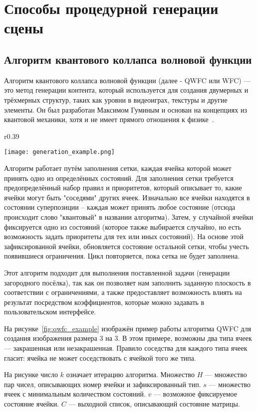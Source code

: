 \section{Способы процедурной генерации сцены}

\subsection*{Алгоритм квантового коллапса волновой функции}

Алгоритм квантового коллапса волновой функции (далее - QWFC или WFC) — это метод генерации контента, который используется для создания двумерных и трёхмерных структур, таких как уровни в видеоиграх, текстуры и другие элементы. Он был разработан Максимом Гуминым и основан на концепциях из квантовой механики, хотя и не имеет прямого отношения к физике~\cite{QWFC}.

\begin{wrapfigure}{r}{0.39\textwidth}
  
  \texttt{[image: generation\_example.png]}
  \caption{Пример работы алгоритма QWFC}
  \label{fig:qwfc_example}
\end{wrapfigure}

Алгоритм работает путём заполнения сетки, каждая ячейка которой может принять одно из определённых состояний. Для заполнения сетки требуется предопределённый набор правил и приоритетов, который описывает то, какие ячейки могут быть "соседями" других ячеек. Изначально все ячейки находятся в состоянии суперпозиции -- каждая может принять любое состояние (отсюда происходит слово "квантовый" в названии алгоритма). Затем, у случайной ячейки фиксируется одно из состояний (которое также выбирается случайно, но есть возможность задать приоритеты для тех или иных состояний). На основе этой зафиксированной ячейки, обновляется состояние остальной сетки, чтобы учесть появившиеся ограничения. Цикл повторяется, пока сетка не будет заполнена.

Этот алгоритм подходит для выполнения поставленной задачи (генерации загородного посёлка), так как он позволяет нам заполнить заданную плоскость в соответствии с ограничениями, а также предоставляет возможность влиять на результат посредством коэффициентов, которые можно задавать в пользовательском интерфейсе.

На рисунке~\ref{fig:qwfc_example} изображён пример работы алгоритма QWFC для создания изображения размера 3 на 3. В этом примере, возможны два типа ячеек --- закрашенная или незакрашенная. Правило соседства для каждого типа ячеек гласит: ячейка не может соседствовать с ячейкой того же типа. 

На рисунке число $k$ означает итерацию алгоритма. Множество $H$ --- множество пар чисел, описывающих номер ячейки и зафиксированный тип. $s$ --- множество ячеек с минимальным количеством состояний. $v$ --- возможное фиксируемое состояние ячейки. $C$ --- выходной список, описывающий состояние матрицы.